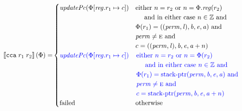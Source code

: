 \documentclass[a4paper]{article}
\newcommand{\sem}[1]{\left\llbracket #1 \right\rrbracket}
\newcommand{\tand}{\text{ and }}
\newcommand{\totherwise}{\text{otherwise }}
\newcommand{\sourcecolor}{\color{blue}}
\newcommand{\src}[1]{{\sourcecolor #1}}
\newcommand{\targetcolor}[1]{\color{black}}
\newcommand{\trg}[1]{{\targetcolor{} #1}}
\newcommand{\zinstr}[1]{\texttt{#1}}
\newcommand{\twoinstr}[3]{
  \ifthenelse{\equal{#2#3}{}}
  {\zinstr{#1}}
  {\zinstr{#1} \; #2 \; #3}
}
\newcommand{\tcca}[2]{\twoinstr{\trg{cca}}{#1}{#2}}
\newcommand{\ints}{\mathbb{Z}}
\newcommand{\update}[2]{[#1 \mapsto #2]}
\newcommand{\updReg}[2]{\update{\reg.#1}{#2}}
\newcommand{\perm}{\var{perm}}
\newcommand{\lin}{\var{l}}
\newcommand{\stkptr}[1]{\mathrm{stack\text{-}ptr}(#1)}
\newcommand{\failed}{\mathrm{failed}}
\newcommand{\var}[1]{\mathit{#1}}
\newcommand{\reg}{\var{reg}}
\newcommand{\baddr}{\var{b}}
\newcommand{\eaddr}{\var{e}}
\newcommand{\aaddr}{\var{a}}
\newcommand{\plainperm}[1]{\textsc{#1}}
\newcommand{\enter}{\plainperm{e}}
\newcommand{\plainfun}[2]{
  \ifthenelse{\equal{#2}{}}
  {\mathit{#1}}
  {\mathit{#1}(#2)}
}
\newcommand{\updPcAddr}[1]{\plainfun{updatePc}{#1}}
\begin{document}
\begin{align*}
  \sem{\tcca{r_1}{r_2}}(\Phi) = & 
                                  \begin{cases}
                                    \updPcAddr{\Phi\updReg{r_1}{c}} &  
                                    \arraycolsep=0pt
                                    \begin{array}[t]{l}
                                      \text{either $n = r_2$ or $n = \Phi.\reg(r_2)$}\\
                                      \quad\text{ and in either case $n \in \ints$ and} \\
                                      \Phi(r_1) = ((\perm,\lin),\baddr,\eaddr,\aaddr) \tand \\
                                      \perm \neq \enter \tand \\
                                      c = ((\perm,\lin),\baddr,\eaddr,\aaddr + n)
                                    \end{array}
                                    \\
                                    \src{\updPcAddr{\Phi\updReg{r_1}{c}}} &  
                                    \sourcecolor\left.
                                    \arraycolsep=0pt
                                    \begin{array}[t]{l}
                                      \text{either $n = r_2$ or $n = \Phi(r_2)$}\\
                                      \quad\text{ and in either case $n \in \ints$ and} \\
                                      \Phi(r_1) = \stkptr{\perm,\baddr,\eaddr,\aaddr} \tand \\
                                      \perm \neq \enter \tand \\
                                      c = \stkptr{\perm,\baddr,\eaddr,\aaddr + n}
                                    \end{array}\right.
                                    \\
                                    \failed & \totherwise
                                  \end{cases}
\end{align*}
\end{document}
